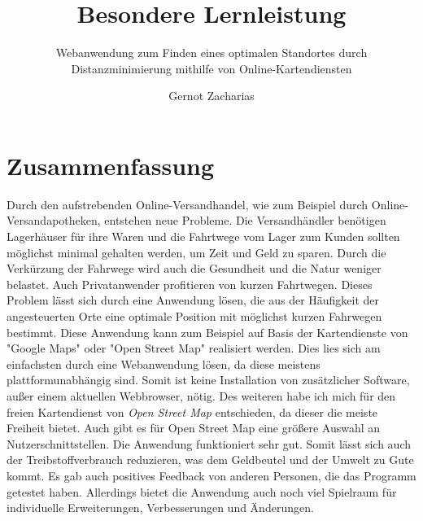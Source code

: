 \documentclass[a4paper, twoside, 12pt]{scrreprt}
\title{Besondere Lernleistung}
\author{Gernot Zacharias}
\subtitle{Webanwendung zum Finden eines optimalen Standortes durch Distanzminimierung mithilfe von Online-Kartendiensten}
\begin{document}
\maketitle
\cleardoublepage
\tableofcontents
\setcounter{page}{1}
\chapter*{Zusammenfassung}
Durch den aufstrebenden Online-Versandhandel, wie zum Beispiel durch Online-Versandapotheken, entstehen neue Probleme.
Die Versandhändler benötigen Lagerhäuser für ihre Waren und die Fahrtwege vom Lager zum Kunden sollten möglichst minimal gehalten werden, um Zeit und Geld zu sparen.
Durch die Verkürzung der Fahrwege wird auch die Gesundheit und die Natur weniger belastet.
Auch Privatanwender profitieren von kurzen Fahrtwegen.
Dieses Problem lässt sich durch eine Anwendung lösen, die aus der Häufigkeit der angesteuerten Orte eine optimale Position mit möglichst kurzen Fahrwegen bestimmt.
Diese Anwendung kann zum Beispiel auf Basis der Kartendienste von "Google Maps" oder "Open Street Map" realisiert werden.
Dies lies sich am einfachsten durch eine Webanwendung lösen, da diese meistens plattformunabhängig sind.
Somit ist keine Installation von zusätzlicher Software, außer einem aktuellen Webbrowser, nötig.
Des weiteren habe ich mich für den freien Kartendienst von \emph{Open Street Map} entschieden, da dieser die meiste Freiheit bietet.
Auch gibt es für Open Street Map eine größere Auswahl an Nutzerschnittstellen.
Die Anwendung funktioniert sehr gut.
Somit lässt sich auch der Treibstoffverbrauch reduzieren, was dem Geldbeutel und der Umwelt zu Gute kommt.
Es gab auch positives Feedback von anderen Personen, die das Programm getestet haben.
Allerdings bietet die Anwendung auch noch viel Spielraum für individuelle Erweiterungen, Verbesserungen und Änderungen.
\end{document}
